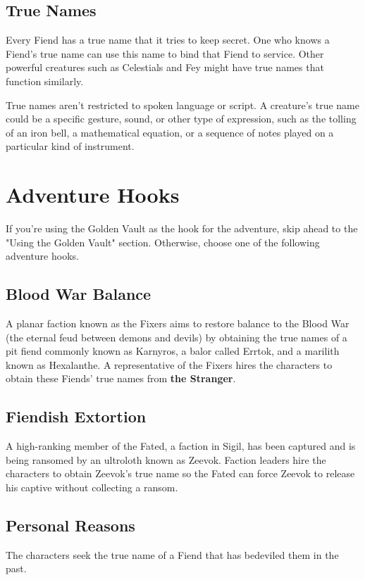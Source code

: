 \documentclass[10pt,a4paper,twoside,bg=print,twocolumn,openany,nodeprecatedcode]{dndbook}
\begin{document}
\subsection{True Names}
Every Fiend has a true name that it tries to keep secret. One who knows a Fiend's true name can use this name to bind that Fiend to service. Other powerful creatures such as Celestials and Fey might have true names that function similarly.

True names aren't restricted to spoken language or script. A creature's true name could be a specific gesture, sound, or other type of expression, such as the tolling of an iron bell, a mathematical equation, or a sequence of notes played on a particular kind of instrument.

\section{Adventure Hooks}
If you're using the Golden Vault as the hook for the adventure, skip ahead to the "Using the Golden Vault" section. Otherwise, choose one of the following adventure hooks.

\subsection{Blood War Balance}
A planar faction known as the Fixers aims to restore balance to the Blood War (the eternal feud between demons and devils) by obtaining the true names of a pit fiend commonly known as Karnyros, a balor called Errtok, and a marilith known as Hexalanthe. A representative of the Fixers hires the characters to obtain these Fiends' true names from \textbf{the Stranger}.

\subsection{Fiendish Extortion}
A high-ranking member of the Fated, a faction in Sigil, has been captured and is being ransomed by an ultroloth known as Zeevok. Faction leaders hire the characters to obtain Zeevok's true name so the Fated can force Zeevok to release his captive without collecting a ransom.

\subsection{Personal Reasons}
The characters seek the true name of a Fiend that has bedeviled them in the past.
\end{document}
